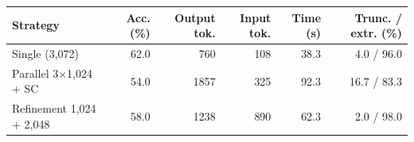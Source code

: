 \begin{tabular}{lrrrrr}
\toprule
Strategy & Acc. (\%) & Output tok. & Input tok. & Time (s) & Trunc. / extr. (\%) \\
\midrule
Single (3,072) & 62.0 & 760 & 108 & 38.3 & 4.0 / 96.0 \\
Parallel 3$\times$1,024 + SC & 54.0 & 1857 & 325 & 92.3 & 16.7 / 83.3 \\
Refinement 1,024 + 2,048 & 58.0 & 1238 & 890 & 62.3 & 2.0 / 98.0 \\
\bottomrule
\end{tabular}
